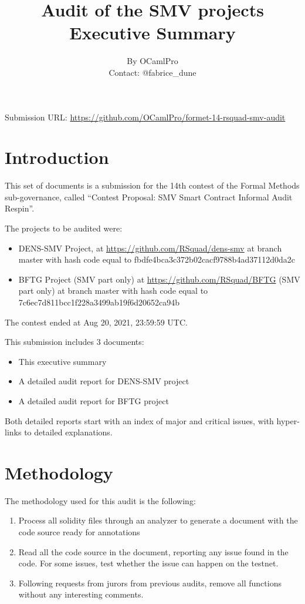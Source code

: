 \documentclass{article}
\begin{document}
\title{Audit of the SMV projects\\Executive Summary}
\author{By OCamlPro\\Contact: @fabrice\_dune}
\maketitle

Submission URL:
\url{https://github.com/OCamlPro/formet-14-rsquad-smv-audit}


\section{Introduction}

This set of documents is a submission for the 14th contest of the
Formal Methods sub-governance, called ``Contest Proposal: SMV Smart
Contract Informal Audit Respin''.

The projects to be audited were:
\begin{itemize}
\item DENS-SMV Project, at \url{https://github.com/RSquad/dens-smv} at branch master with
  hash code equal to fbdfe4bca3c372b02cacf9788b4ad37112d0da2c
\item BFTG Project (SMV part only) at
  \url{https://github.com/RSquad/BFTG} (SMV part only) at branch
  master with hash code equal to
  7c6ec7d811bcc1f228a3499ab19f6d20652ca94b
\end{itemize}

The contest ended at Aug 20, 2021, 23:59:59 UTC.

This submission includes 3 documents:
\begin{itemize}
\item This executive summary
\item A detailed audit report for DENS-SMV project
\item A detailed audit report for BFTG project
\end{itemize}

Both detailed reports start with an index of major and critical
issues, with hyper-links to detailed explanations.

\section{Methodology}

The methodology used for this audit is the following:
\begin{enumerate}
\item Process all solidity files through an analyzer to generate a
  document with the code source ready for annotations
\item Read all the code source in the document, reporting any issue
  found in the code. For some issues, test whether the issue can
  happen on the testnet.
\item Following requests from jurors from previous audits, remove all
  functions without any interesting comments.
\end{enumerate}
\end{document}
